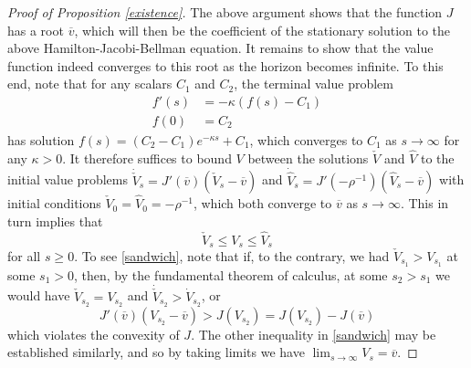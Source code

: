 \documentclass[11pt]{article}
\theoremstyle{plain}
\theoremstyle{definition} %
\begin{document}
\begin{proof}[Proof of Proposition \ref{existence}]
The above argument shows that the function $J$ has a root $\overline{v}$, which will then be the coefficient of the stationary solution to the above Hamilton-Jacobi-Bellman equation. It remains to show that the value function indeed converges to this root as the horizon becomes infinite. To this end, note that for any scalars $C_1$ and $C_2$, the terminal value problem
\begin{align*}
f'(s) & = -\kappa (f(s) - C_1) 
\\ f(0) & = C_2
\end{align*}
has solution $f(s) = (C_2 - C_1)e^{-\kappa s} + C_1$, which converges to $C_1$ as $s \rightarrow \infty$ for any $\kappa>0$. It therefore suffices to bound $V$ between the solutions $\check{V}$ and $\hat{V}$ to the initial value problems $\dot{\check{V}}_s = J'(\overline{v})(\check{V}_s - \overline{v})$ and $\dot{\hat{V}}_s = J'(-\rho^{-1})(\hat{V}_s - \overline{v})$ with initial conditions $\check{V}_0 = \hat{V}_0 = -\rho^{-1}$, which both converge to $\overline{v}$ as $s \rightarrow \infty$. This in turn implies that 
\begin{equation}
\check{V}_s \leq V_s \leq \hat{V}_s
\label{sandwich}
\end{equation}
for all $s \geq 0$. To see \eqref{sandwich}, note that if, to the contrary, we had $\check{V}_{s_1} > V_{s_1}$ at some $s_1 > 0$, then, by the fundamental theorem of calculus, at some $s_2 > s_1$ we would have $\check{V}_{s_2} = V_{s_2}$ and $\dot{\check{V}}_{s_2} > \dot{V}_{s_2}$, or
$$
J'(\overline{v})(V_{s_2} - \overline{v}) > J(V_{s_2}) = J(V_{s_2}) - J(\overline{v})
$$
which violates the convexity of $J$. The other inequality in \eqref{sandwich} may be established similarly, and so by taking limits we have $\lim_{s \rightarrow \infty} V_s = \overline{v}$. 
\end{proof}
\end{document}
